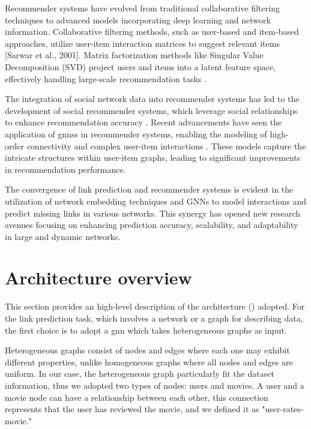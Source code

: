 \documentclass[11pt]{article}
\begin{document}
Recommender systems have evolved from traditional collaborative filtering techniques to advanced models 
incorporating deep learning and network information. Collaborative filtering methods, such as user-based 
and item-based approaches, utilize user-item interaction matrices to suggest relevant items [Sarwar et al., 2001]. 
Matrix factorization methods like Singular Value Decomposition (SVD) project users and items into a latent feature 
space, effectively handling large-scale recommendation tasks \cite{sarwar2001item}.

The integration of social network data into recommender systems has led to the development of social recommender 
systems, which leverage social relationships to enhance recommendation accuracy \cite{jamali2010matrix}. 
Recent advancements have seen the application of \acp{gnn}s in recommender systems, enabling the modeling of high-order 
connectivity and complex user-item interactions \cite{wang2019neural}. These models capture the intricate structures 
within user-item graphs, leading to significant improvements in recommendation performance.

The convergence of link prediction and recommender systems is evident in the utilization of network embedding 
techniques and GNNs to model interactions and predict missing links in various networks. This synergy has opened new 
research avenues focusing on enhancing prediction accuracy, scalability, and adaptability in large and dynamic networks.

\section{Architecture overview}\label{sec:architecture-overview}
This section provides an high-level description of the architecture () adopted.
For the link prediction task, which involves a network or a graph for describing data, the first choice is to adopt a \ac{gnn} which takes heterogeneous graphs as input. 

Heterogeneous graphs consist of nodes and edges where each one may exhibit different properties, 
unlike homogeneous graphs where all nodes and edges are uniform.
In our case, the heterogeneous graph particularly fit the dataset information, 
thus we adopted two types of nodes: users and movies.
A user and a movie node can have a relationship between each other, this connection represents that the user has reviewed the movie, and we defined it as "user-rates-movie."
\end{document}
